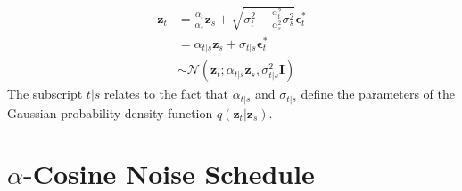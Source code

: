 \documentclass[ oneside,%
                    author={George Herbert},
                    degree={MSci},
                     title={Video Diffusion Models for Climate Simulations},
                  subtitle={}]{dissertation}
\begin{document}
\begin{align}
      \mathbf{z}_t&=\frac{\alpha_t}{\alpha_s}\mathbf{z}_s+\sqrt{\sigma_t^2-\frac{\alpha_t^2}{\alpha_s^2}\sigma_s^2}\boldsymbol\epsilon_t^*\\
      &=\alpha_{t|s}\mathbf{z}_s+\sigma_{t|s}\boldsymbol\epsilon_t^*\\
      &\sim\mathcal{N}\left(\mathbf{z}_t;\alpha_{t|s}\mathbf{z}_s,\sigma_{t|s}^2\mathbf{I}\right)
\end{align}
The subscript $t|s$ relates to the fact that $\alpha_{t|s}$ and $\sigma_{t|s}$ define the parameters of the Gaussian probability density function $q(\mathbf{z}_t|\mathbf{z}_s)$.

\section{$\alpha$-Cosine Noise Schedule}
\label{appx:diffusion_cosine_noise_schedule}
\end{document}
